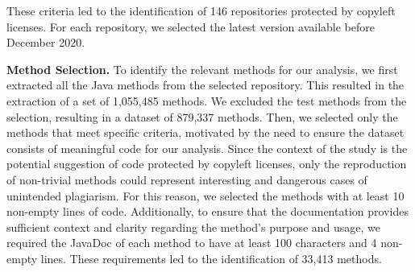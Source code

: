 These criteria led to the identification of 146 repositories protected by copyleft licenses. For each repository, we selected the latest version available before December 2020. %

\textbf{Method Selection.} To identify the relevant methods for our analysis, we first extracted all the Java methods from the selected repository. 
This %
resulted in the extraction of a set of 1,055,485 methods.
We excluded the test methods from the selection, resulting in a dataset of 879,337 methods. Then, we selected only the methods that meet specific criteria, motivated by the need to ensure the dataset consists of meaningful code for our analysis. Since the context of the study is the potential suggestion of code protected by copyleft licenses, only the reproduction of non-trivial methods could represent interesting and dangerous cases of unintended plagiarism. For this reason, we selected the methods with at least 10 non-empty lines of code. 
Additionally, to ensure that the documentation provides sufficient context and clarity regarding the method's purpose and usage, we required the JavaDoc of each method to have at least 100 characters and 4 non-empty lines. %
These requirements led to the identification of 33,413 methods. %

